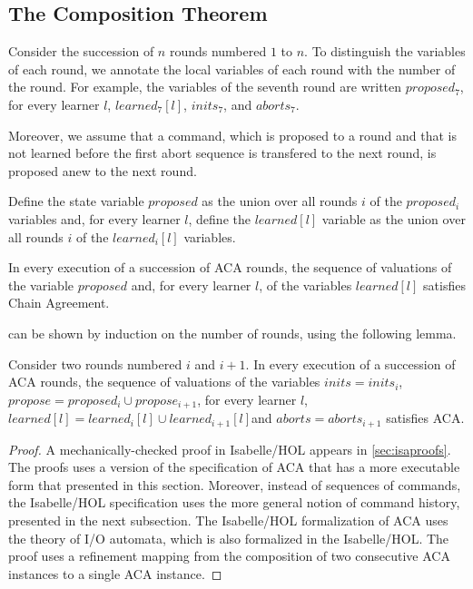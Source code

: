 \subsection{The Composition Theorem}

Consider the succession of $n$ rounds numbered $1$ to $n$.  To
distinguish the variables of each round, we annotate the local
variables of each round with the number of the round. For example, the
variables of the seventh round are written $proposed_7$, for every
learner $l$, $learned_7\left[ l \right]$, $inits_7$, and $aborts_7$.

Moreover, we assume that a command, which is proposed to a round and that
is not learned before the first abort sequence is transfered to the
next round, is proposed anew to the next round.

Define the state variable $proposed$ as the union over all rounds $i$
of the $proposed_i$ variables and, for every learner $l$, 
define the $learned\left[ l \right]$ variable as the union over all
rounds $i$ of the $learned_i\left[ l \right]$ variables.

\begin{thm}
    \label{thm:comp}
    In every execution of a succession of ACA rounds, the sequence of valuations
    of the variable $proposed$ and, for every learner $l$, of the variables
    $learned\left[ l \right]$ satisfies Chain Agreement.
\end{thm}
 can be shown by induction on the number of rounds,
using the following lemma.
\begin{lem}
  \label{lem:comp}
    Consider two rounds numbered $i$ and $i+1$. In every execution of a
    succession of ACA rounds, the sequence of valuations of the variables $inits
    = inits_i$, $propose = proposed_i \cup propose_{i+1}$, for every learner
    $l$, $learned\left[ l \right] = learned_i\left[ l \right] \cup
    learned_{i+1}\left[ l \right]$and $aborts = aborts_{i+1}$ satisfies ACA.
\end{lem}
\begin{proof}
  A mechanically-checked proof in Isabelle/HOL appears in \cref{sec:isaproofs}.
  The proofs uses a version of the specification of ACA that has a more
  executable form that presented in this section. Moreover,
  instead of sequences of commands, the Isabelle/HOL specification uses the more
  general notion of command history, presented in the next subsection.
  The Isabelle/HOL formalization of ACA uses the theory of I/O automata, which
  is also formalized in the Isabelle/HOL. The proof uses a refinement
  mapping from the composition of two consecutive ACA instances to a single ACA
  instance.
\end{proof}

